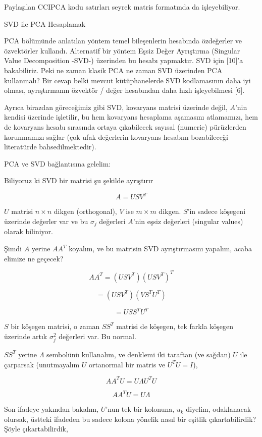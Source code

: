 \documentclass[12pt,fleqn]{article}\usepackage{../../common}
\begin{document}
Paylaşılan CCIPCA kodu satırları seyrek matris formatında da işleyebiliyor.

SVD ile PCA Hesaplamak

PCA bölümünde anlatılan yöntem temel bileşenlerin hesabında özdeğerler ve
özvektörler kullandı. Alternatif bir yöntem Eşsiz Değer Ayrıştırma
(Singular Value Decomposition -SVD-) üzerinden bu hesabı yapmaktır. SVD
için [10]'a bakabiliriz. Peki ne zaman klasik PCA ne zaman SVD üzerinden PCA
kullanmalı? Bir cevap belki mevcut kütüphanelerde SVD kodlamasının daha iyi
olması, ayrıştırmanın özvektör / değer hesabından daha hızlı işleyebilmesi
[6].

Ayrıca birazdan göreceğimiz gibi SVD, kovaryans matrisi üzerinde
değil, $A$'nin kendisi üzerinde işletilir, bu hem kovaryans hesaplama
aşamasını atlamamızı, hem de kovaryans hesabı sırasında ortaya
çıkabilecek sayısal (numeric) pürüzlerden korunmamızı sağlar (çok ufak
değerlerin kovaryans hesabını bozabileceği literatürde
bahsedilmektedir).

PCA ve SVD bağlantısına gelelim:

Biliyoruz ki SVD bir matrisi şu şekilde ayrıştırır

$$A = USV^T$$

$U$ matrisi $n \times n$ dikgen (orthogonal), $V$ ise $m \times m$
dikgen. $S$'in sadece köşegeni üzerinde değerler var ve bu  $\sigma_j$
değerleri $A$'nin eşsiz değerleri (singular values) olarak biliniyor.

Şimdi $A$ yerine $AA^T$ koyalım, ve bu matrisin SVD ayrıştırmasını yapalım,
acaba elimize ne geçecek?

$$ AA^T = (USV^T)(USV^T)^T $$

$$ = (USV^T)(V S^T U^T) $$

$$ = U S S^T U^T $$

$S$ bir köşegen matrisi, o zaman $SS^T$ matrisi de köşegen, tek farkla
köşegen üzerinde artık $\sigma_j^2$ değerleri var. Bu normal.

$SS^T$ yerine $\Lambda$ sembolünü kullanalım, ve denklemi iki taraftan
(ve sağdan) $U$ ile çarparsak (unutmayalım $U$ ortanormal bir matris
ve $U^T U = I$),

$$ AA^TU = U \Lambda U^TU $$

$$ AA^TU = U \Lambda   $$

Son ifadeye yakından bakalım, $U$'nun tek bir kolonuna, $u_k$ diyelim,
odaklanacak olursak, üstteki ifadeden bu sadece kolona yönelik nasıl
bir eşitlik çıkartabilirdik? Şöyle çıkartabilirdik,
\end{document}
